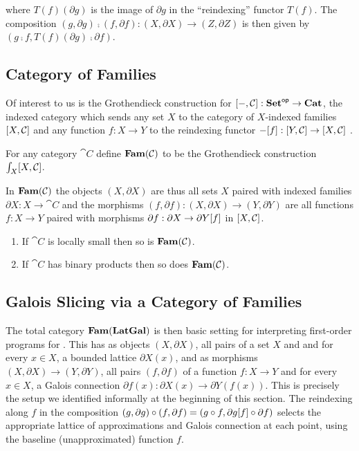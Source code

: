 \noindent where $T(f)(\partial g)$ is the image of $\partial g$ in the ``reindexing'' functor $T(f)$. The
composition $(g, \partial g) \comp (f, \partial f): (X, \partial X) \to (Z, \partial Z)$ is then given by $(g
\comp f, T(f)(\partial g) \comp \partial f)$.

\subsection{Category of Families}
\label{sec:Fam}

Of interest to us is the Grothendieck construction for $[-,\mathcal{C}]: \mathbf{Set}^{\mathsf{op}} \to \mathbf{Cat}$, the indexed
category which sends any set $X$ to the category of $X$-indexed families $[X,\mathcal{C}]$ and any function
$f: X \to Y$ to the reindexing functor $-[f]: [Y,\mathcal{C}] \to [X,\mathcal{C}]$ .

\begin{definition}
\label{def:Fam}
For any category $\cat{C}$ define $\mathbf{Fam}(\mathcal{C})$ to be the Grothendieck construction
$\int_{X}[X,\mathcal{C}]$.
\end{definition}

\noindent In $\mathbf{Fam}(\mathcal{C})$ the objects $(X, \partial X)$ are thus all sets $X$ paired with indexed families
$\partial X: X \to \cat{C}$ and the morphisms $(f, \partial f): (X, \partial X) \to (Y, \partial Y)$ are all
functions $f: X \to Y$ paired with morphisms $\partial f: \partial X \to \partial Y[f]$ in
$[X,\mathcal{C}]$.

\begin{proposition}
\label{prop:Grothendieck:fam-inherits}
\item {}
\begin{enumerate}
\item If $\cat{C}$ is locally small then so is $\mathbf{Fam}(\mathcal{C})$.
\item If $\cat{C}$ has binary products then so does $\mathbf{Fam}(\mathcal{C})$.
\end{enumerate}
\end{proposition}

\subsection{Galois Slicing via a Category of Families}
\label{sec:fam:galois-slicing}

The total category $\mathbf{Fam}(\mathbf{LatGal})$ is then basic setting for interpreting first-order programs for \GPS. This
has as objects $(X, \partial X)$, all pairs of a set $X$ and and for every $x \in X$, a bounded lattice
$\partial X(x)$, and as morphisms $(X, \partial X) \to (Y, \partial Y)$, all pairs $(f, \partial f)$ of a
function $f: X \to Y$ and for every $x \in X$, a Galois connection $\partial f(x): \partial X(x) \to \partial
Y(f(x))$. This is precisely the setup we identified informally at the beginning of this section. The
reindexing along $f$ in the composition $(g, \partial g) \circ (f, \partial f) = (g \circ f, \partial
g[f] \circ \partial f)$ selects the appropriate lattice of approximations and Galois connection at each
point, using the baseline (unapproximated) function $f$.

